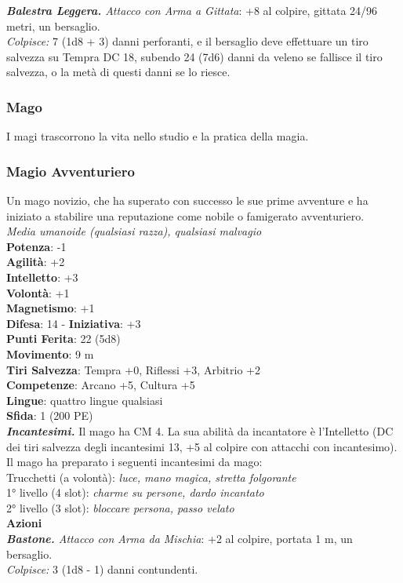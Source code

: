 \begin{multicols}{2}
\emph{\textbf{Balestra Leggera.} Attacco con Arma a Gittata}: +8 al colpire, gittata 24/96 metri, un bersaglio. \\
\emph{Colpisce:} 7 (1d8 + 3) danni perforanti, e il bersaglio deve effettuare un tiro salvezza su Tempra DC  18, subendo 24 (7d6) danni da veleno se fallisce il tiro salvezza, o la metà di questi danni se lo riesce.\\

\subsubsection{Mago}

I magi trascorrono la vita nello studio e la pratica della magia.\\

\subsubsection{Magio Avventuriero}

Un mago novizio, che ha superato con successo le sue prime avventure e ha iniziato a stabilire una reputazione come nobile o famigerato avventuriero.\\
\emph{Media umanoide (qualsiasi razza), qualsiasi malvagio}\\
\textbf{Potenza}: -1\\
\textbf{Agilità}: +2\\
\textbf{Intelletto}: +3\\
\textbf{Volontà}: +1\\
\textbf{Magnetismo}: +1\\
\textbf{Difesa}: 14 - \textbf{Iniziativa}: +3\\
\textbf{Punti Ferita}: 22 (5d8)\\
\textbf{Movimento}: 9 m\\
\textbf{Tiri Salvezza}: Tempra +0, Riflessi +3, Arbitrio +2 \\
\textbf{Competenze}: Arcano +5, Cultura +5\\
\textbf{Lingue}: quattro lingue qualsiasi\\
\textbf{Sfida}: 1 (200 PE)\smallskip\\
\emph{\textbf{Incantesimi.}} Il mago ha CM 4. La sua abilità da incantatore è l'Intelletto (DC dei tiri salvezza degli incantesimi 13, +5 al colpire con attacchi con incantesimo). Il mago ha preparato i seguenti incantesimi da mago: \\
Trucchetti (a volontà): \emph{luce, mano magica, stretta folgorante} \\
1° livello (4 slot): \emph{charme su persone, dardo incantato} \\
2° livello (3 slot): \emph{bloccare persona, passo velato}\\
\smallskip\textbf{Azioni}\\
\emph{\textbf{Bastone.} Attacco con Arma da Mischia}: +2 al colpire, portata 1 m, un bersaglio.\\
\emph{Colpisce:} 3 (1d8 - 1) danni contundenti.\\


\end{multicols}
